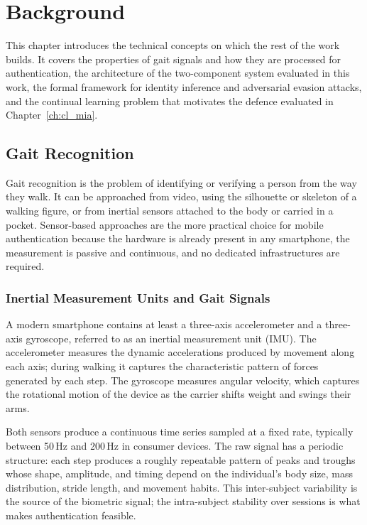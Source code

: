 \chapter{Background}
\label{ch:background}

This chapter introduces the technical concepts on which the rest of the work builds. It covers the properties of gait signals and how they are processed for authentication, the architecture of the two-component system evaluated in this work, the formal framework for identity inference and adversarial evasion attacks, and the continual learning problem that motivates the defence evaluated in Chapter~\ref{ch:cl_mia}.

\section{Gait Recognition}
\label{sec:bg_gait}

Gait recognition is the problem of identifying or verifying a person from the way they walk. It can be approached from video, using the silhouette or skeleton of a walking figure, or from inertial sensors attached to the body or carried in a pocket. Sensor-based approaches are the more practical choice for mobile authentication because the hardware is already present in any smartphone, the measurement is passive and continuous, and no dedicated infrastructures are required.

\subsection{Inertial Measurement Units and Gait Signals}
\label{ssec:bg_imu}

A modern smartphone contains at least a three-axis accelerometer and a three-axis gyroscope, referred to as an inertial measurement unit (IMU). The accelerometer measures the dynamic accelerations produced by movement along each axis; during walking it captures the characteristic pattern of forces generated by each step. The gyroscope measures angular velocity, which captures the rotational motion of the device as the carrier shifts weight and swings their arms.

Both sensors produce a continuous time series sampled at a fixed rate, typically between 50\,Hz and 200\,Hz in consumer devices. The raw signal has a periodic structure: each step produces a roughly repeatable pattern of peaks and troughs whose shape, amplitude, and timing depend on the individual's body size, mass distribution, stride length, and movement habits. This inter-subject variability is the source of the biometric signal; the intra-subject stability over sessions is what makes authentication feasible.

